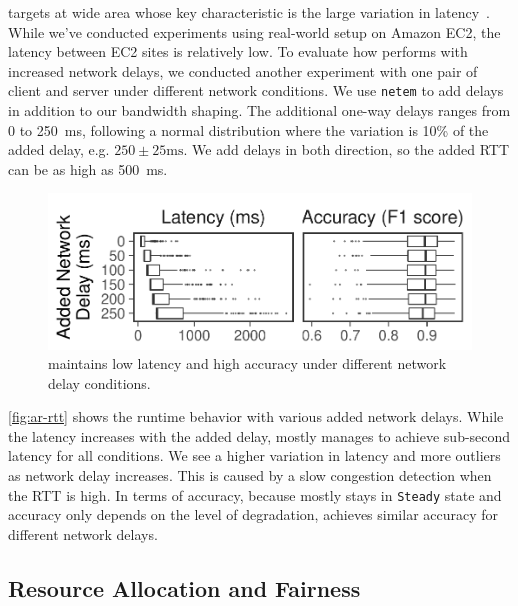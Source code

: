  \sysname{} targets at wide area
whose key characteristic is the large variation in
latency~\cite{li2010cloudcmp}. While we've conducted experiments using
real-world setup on Amazon EC2, the latency between EC2 sites is relatively low.
To evaluate how \sysname{} performs with increased network delays, we conducted
another experiment with one pair of client and server under different network
conditions. We use \texttt{netem} to add delays in addition to our bandwidth
shaping. The additional one-way delays ranges from 0 to \SI{250}{ms}, following
a normal distribution where the variation is 10\% of the added delay, e.g.
$250\pm 25\text{ms}$. We add delays in both direction, so the added RTT can be
as high as \SI{500}{ms}.

\begin{figure}
  \centering
  \includegraphics[width=.88\columnwidth]{figures/runtime_darknet-bench.pdf}
  \vspace{-0.5em}
  \caption{\sysname{} maintains low latency and high accuracy under different
    network delay conditions.}
  \label{fig:ar-rtt}
  \vspace{-1em}
\end{figure}

\autoref{fig:ar-rtt} shows the runtime behavior with various added network
delays. While the latency increases with the added delay, \sysname{} mostly
manages to achieve sub-second latency for all conditions. We see a higher
variation in latency and more outliers as network delay increases. This is
caused by a slow congestion detection when the RTT is high. In terms of
accuracy, because \sysname{} mostly stays in \texttt{Steady} state and accuracy
only depends on the level of degradation, \sysname{} achieves similar accuracy
for different network delays.

\subsection{Resource Allocation and Fairness}
\label{sec:multi-task-alloc}

